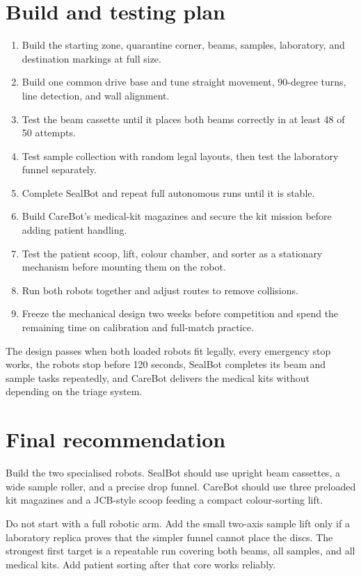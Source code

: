 \documentclass[11pt,a4paper]{article}
\begin{document}
\section{Build and testing plan}

\begin{enumerate}
  \item Build the starting zone, quarantine corner, beams, samples, laboratory, and destination markings at full size.
  \item Build one common drive base and tune straight movement, 90-degree turns, line detection, and wall alignment.
  \item Test the beam cassette until it places both beams correctly in at least 48 of 50 attempts.
  \item Test sample collection with random legal layouts, then test the laboratory funnel separately.
  \item Complete SealBot and repeat full autonomous runs until it is stable.
  \item Build CareBot's medical-kit magazines and secure the kit mission before adding patient handling.
  \item Test the patient scoop, lift, colour chamber, and sorter as a stationary mechanism before mounting them on the robot.
  \item Run both robots together and adjust routes to remove collisions.
  \item Freeze the mechanical design two weeks before competition and spend the remaining time on calibration and full-match practice.
\end{enumerate}

The design passes when both loaded robots fit legally, every emergency stop works, the robots stop before 120 seconds, SealBot completes its beam and sample tasks repeatedly, and CareBot delivers the medical kits without depending on the triage system.

\section{Final recommendation}

Build the two specialised robots. SealBot should use upright beam cassettes, a wide sample roller, and a precise drop funnel. CareBot should use three preloaded kit magazines and a JCB-style scoop feeding a compact colour-sorting lift.

Do not start with a full robotic arm. Add the small two-axis sample lift only if a laboratory replica proves that the simpler funnel cannot place the discs. The strongest first target is a repeatable run covering both beams, all samples, and all medical kits. Add patient sorting after that core works reliably.
\end{document}
